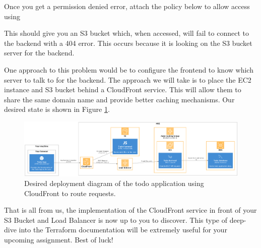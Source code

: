 \documentclass{csse4400}
\begin{document}
\noindent Once you get a permission denied error,
attach the policy below to allow access using 


This should give you an S3 bucket which, when accessed,
will fail to connect to the backend with a 404 error.
This occurs because it is looking on the S3 bucket server for the backend.

One approach to this problem would be to configure the frontend to know which server to talk to for the backend.
The approach we will take is to place the EC2 instance and S3 bucket behind a CloudFront service.
This will allow them to share the same domain name and provide better caching mechanisms.
Our desired state is shown in Figure \ref{fig:s3deployment}.

\begin{figure}[ht]
\includegraphics[width=\textwidth]{diagrams/S3Deployment}
\caption{Desired deployment diagram of the todo application using CloudFront to route requests.}
\label{fig:s3deployment}
\end{figure}

That is all from us,
the implementation of the CloudFront service in front of your S3 Bucket and Load Balancer is now up to you to discover.
This type of deep-dive into the Terraform documentation will be extremely useful for your upcoming assignment.
Best of luck!



\end{document}
